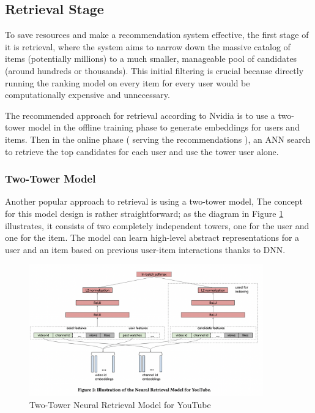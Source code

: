 \subsection{Retrieval Stage}

To save resources and make a recommendation system effective, the first stage of it is retrieval, 
where the system aims to narrow down the massive 
catalog of items (potentially millions) to a much smaller, 
manageable pool of candidates (around hundreds or thousands).
This initial filtering is crucial because 
directly running the ranking model on every item for every 
user would be computationally expensive and unnecessary.

The recommended approach for retrieval according to Nvidia \cite{NvidiaFeatureStores} is to use a two-tower model in the offline training phase to generate embeddings for users and items.
Then in the online phase ( serving the recommendations ), an ANN search to retrieve the top candidates for each user and use the tower user alone.

\subsubsection{Two-Tower Model}

Another popular approach to retrieval is using a two-tower model, 
The concept for this model design is rather straightforward; as the diagram in Figure \ref{fig:TwoTowerModel} illustrates, it consists of two completely independent towers, 
one for the user and one for the item. 
The model can learn high-level abstract representations for a user and an item 
based on previous user-item interactions thanks to DNN. 

\begin{figure}[H]
    \centering
    \includegraphics[width=0.9\textwidth]{assets/two_tower.png}
    \caption[Two-Tower Neural Retrieval Model for YouTube]{Two-Tower Neural Retrieval Model for YouTube \cite{YoutubeTwoTower}}
    \label{fig:TwoTowerModel}
\end{figure}

